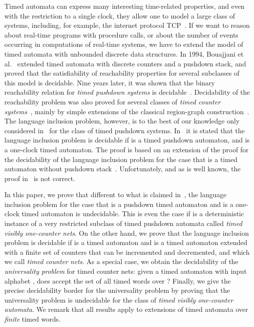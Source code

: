 \documentclass{CSML}
\theoremstyle{plain}\newtheorem{theorem}[thm]{Theorem}
\theoremstyle{plain}\newtheorem{corollary}[thm]{Corollary}
\theoremstyle{plain}\newtheorem{example}[thm]{Example}
\theoremstyle{plain}\newtheorem{lemma}[thm]{Lemma}
\theoremstyle{plain}\newtheorem{remark}[thm]{Remark}
\begin{document}
Timed automata can express many interesting time-related properties, and even with the restriction to a single clock, they  allow one to model a large class of systems, including, for example, the internet protocol TCP~\cite{TCP}.  
If we want to reason about real-time programs with procedure calls, or about the number of events occurring in computations of real-time systems, we have to extend the model of timed automata with unbounded discrete data structures. In 1994, Bouajjani et al.~\cite{DBLP:conf/hybrid/BouajjaniER94} extended timed automata with discrete counters and a pushdown stack, and proved that the satisfiability of reachability properties for several subclasses of this model is decidable. 
Nine years later, it was shown that the binary reachability relation for \emph{timed pushdown systems} is decidable~\cite{DBLP:journals/tcs/Dang03}.  Decidability of the reachability problem was also proved for several classes of \emph{timed counter systems}~\cite{DBLP:journals/entcs/BouchyFS09}, mainly by simple extensions of the classical region-graph construction~\cite{AD94}. 
The language inclusion problem, however, is to the best of our knowledge only considered in~\cite{EmmiM06} for the class of timed pushdown systems. 
In~\cite{EmmiM06} it is stated that the language inclusion problem is decidable if  is a timed pushdown automaton, and  is a one-clock timed automaton. 
The proof is based on an extension of the proof for the decidability of the language inclusion problem for the case that  is a timed automaton without pushdown stack~\cite{DBLP:conf/lics/OuaknineW04}. 
Unfortunately, and as is well known, the proof in~\cite{EmmiM06} is not correct. 

In this paper, 
we prove that different to what is claimed in~\cite{EmmiM06}, the language inclusion problem for the case that  is a  pushdown timed automaton and  is a one-clock timed automaton is undecidable. This is even the case if  is a deterministic instance of a very restricted subclass of timed pushdown automata called \emph{timed visibly one-counter nets}.
On the other hand,
we prove that the language inclusion problem is decidable if  is a timed automaton and  is a timed automaton extended with a finite set of counters that can be incremented and decremented, and which we call \emph{timed counter nets}. As a special case, we obtain the decidability of the \emph{universality problem} for timed counter nets: given a timed automaton  with input alphabet , does  accept the set of all timed words over ?
Finally, we give the precise decidability border for the universality problem by proving that the universality problem is undecidable for the class of \emph{timed visibly one-counter automata}. 
We remark that all results apply to extensions of timed automata over \emph{finite} timed words. 
\end{document}
